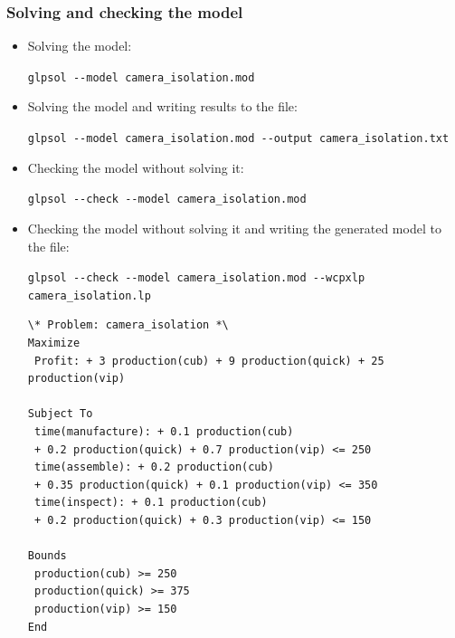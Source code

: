 \documentclass[landscape]{beamer}
\begin{document}
\begin{frame}[fragile]
  \frametitle{Solving and checking the model} 
\begin{footnotesize}  
\begin{itemize}  
\item Solving the model:\\
          \begin{tiny}
         \verb=glpsol --model camera_isolation.mod=
         \end{tiny}
\item Solving the model and writing results to the file:
         \begin{tiny}
         \verb=glpsol --model camera_isolation.mod --output camera_isolation.txt=   
         \end{tiny}
\item Checking  the model without solving it:
          \begin{tiny}
         \verb=glpsol --check --model camera_isolation.mod=      
         \end{tiny}
\item Checking  the model without solving it and writing the generated model to the file:  
\begin{tiny}
         \verb=glpsol --check --model camera_isolation.mod --wcpxlp camera_isolation.lp=
\end{tiny}                
\begin{tiny}
\begin{verbatim}
\* Problem: camera_isolation *\
Maximize
 Profit: + 3 production(cub) + 9 production(quick) + 25 production(vip)

Subject To
 time(manufacture): + 0.1 production(cub)
 + 0.2 production(quick) + 0.7 production(vip) <= 250
 time(assemble): + 0.2 production(cub)
 + 0.35 production(quick) + 0.1 production(vip) <= 350
 time(inspect): + 0.1 production(cub)
 + 0.2 production(quick) + 0.3 production(vip) <= 150

Bounds
 production(cub) >= 250
 production(quick) >= 375
 production(vip) >= 150
End
\end{verbatim}
\end{tiny}
\end{itemize}   
\end{footnotesize} 
\end{frame} 
\end{document}
